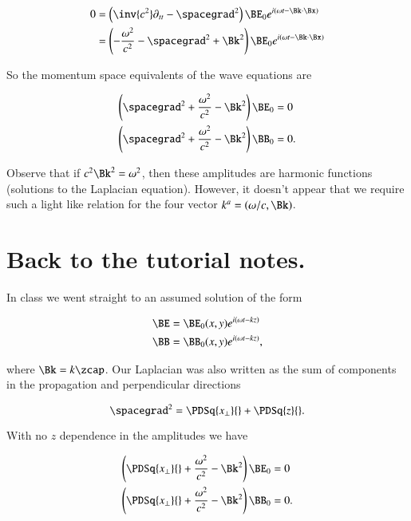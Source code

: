 \begin{align*}
0 &=
\left(\inv{c^2} \partial_{tt} - \spacegrad^2 \right) \BE_0 e^{i (\omega t - \Bk \cdot \Bx)} \\
&=
\left(-\frac{\omega^2}{c^2} - \spacegrad^2 + \Bk^2 \right) \BE_0 e^{i (\omega t - \Bk \cdot \Bx)}
\end{align*}

So the momentum space equivalents of the wave equations are

\begin{align}\label{eqn:relativisticElectrodynamicsT4:170}
\left( \spacegrad^2 +\frac{\omega^2}{c^2} - \Bk^2 \right) \BE_0 &= 0 \\
\left( \spacegrad^2 +\frac{\omega^2}{c^2} - \Bk^2 \right) \BB_0 &= 0.
\end{align}

Observe that if $c^2 \Bk^2 = \omega^2$, then these amplitudes are harmonic functions (solutions to the Laplacian equation).  However, it doesn't appear that we require such a light like relation for the four vector $k^a = (\omega/c, \Bk)$.

\section{Back to the tutorial notes.}

In class we went straight to an assumed solution of the form

\begin{align}\label{eqn:relativisticElectrodynamicsT4:190}
\BE &= \BE_0(x, y) e^{ i(\omega t - k z) } \\
\BB &= \BB_0(x, y) e^{ i(\omega t - k z) },
\end{align}

where $\Bk = k \zcap$.  Our Laplacian was also written as the sum of components in the propagation and perpendicular directions

\begin{equation}\label{eqn:relativisticElectrodynamicsT4:210}
\spacegrad^2 = \PDSq{x_\perp}{} + \PDSq{z}{}.
\end{equation}

With no $z$ dependence in the amplitudes we have

\begin{align}\label{eqn:relativisticElectrodynamicsT4:170b}
\left( \PDSq{x_\perp}{} +\frac{\omega^2}{c^2} - \Bk^2 \right) \BE_0 &= 0 \\
\left( \PDSq{x_\perp}{} +\frac{\omega^2}{c^2} - \Bk^2 \right) \BB_0 &= 0.
\end{align}


